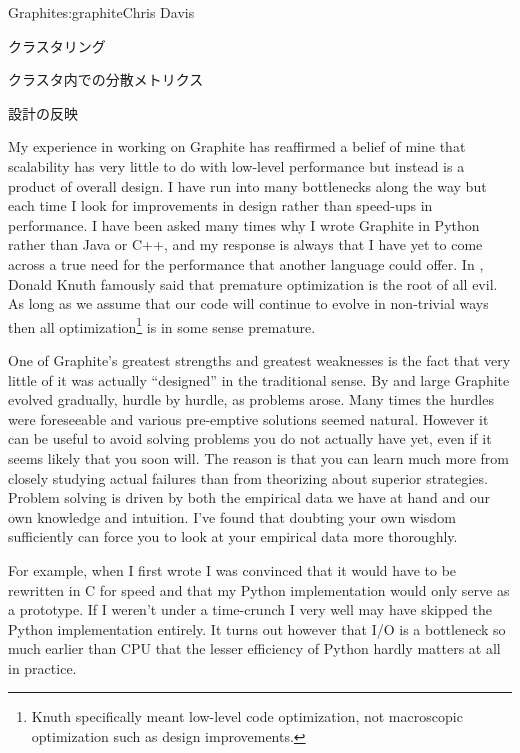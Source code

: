 \begin{aosachapter}{Graphite}{s:graphite}{Chris Davis}
\begin{aosasect1}{クラスタリング}
\begin{aosasect2}{クラスタ内での分散メトリクス}
\end{aosasect2}

\end{aosasect1}

\begin{aosasect1}{設計の反映}

My experience in working on Graphite has reaffirmed a belief of mine
that scalability has very little to do with low-level performance but
instead is a product of overall design. I have run into many
bottlenecks along the way but each time I look for improvements in
design rather than speed-ups in performance. I have been asked many
times why I wrote Graphite in Python rather than Java or C++, and my
response is always that I have yet to come across a true need for the
performance that another language could offer. In
\cite{bib:knuth:goto}, Donald Knuth famously said that premature
optimization is the root of all evil.  As long as we assume that our
code will continue to evolve in non-trivial ways then all
optimization\footnote{Knuth specifically meant low-level code
optimization, not macroscopic optimization such as design
improvements.} is in some sense premature.

One of Graphite's greatest strengths and greatest weaknesses is the
fact that very little of it was actually ``designed'' in the
traditional sense.  By and large Graphite evolved gradually, hurdle by
hurdle, as problems arose. Many times the hurdles were foreseeable and
various pre-emptive solutions seemed natural. However it can be useful
to avoid solving problems you do not actually have yet, even if it
seems likely that you soon will. The reason is that you can learn much
more from closely studying actual failures than from theorizing about
superior strategies.  Problem solving is driven by both the empirical
data we have at hand and our own knowledge and intuition. I've found
that doubting your own wisdom sufficiently can force you to look at
your empirical data more thoroughly.

For example, when I first wrote  I was convinced that it would
have to be rewritten in C for speed and that my Python implementation
would only serve as a prototype. If I weren't under a time-crunch I
very well may have skipped the Python implementation entirely. It
turns out however that I/O is a bottleneck so much earlier than CPU
that the lesser efficiency of Python hardly matters at all in
practice.


\end{aosasect1}
\end{aosachapter}
